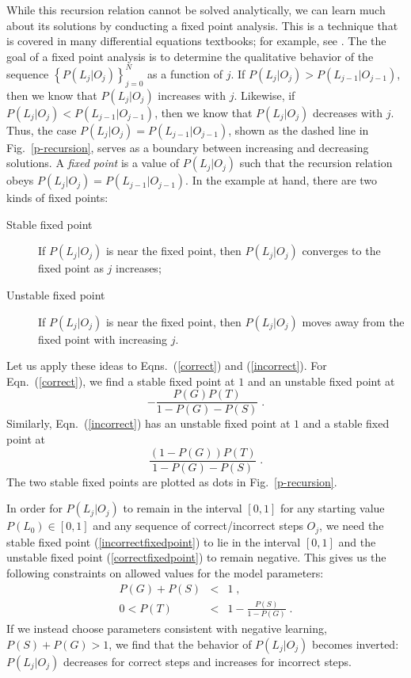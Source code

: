 \documentclass{acmlarge-edm}
\begin{document}
While this recursion relation cannot be solved analytically, we can learn
much about its solutions by conducting a fixed point analysis. 
This is a technique that is covered in many differential equations textbooks; for
example, see \cite{blanchard_differential_2006}.  The the goal of a
fixed point  analysis is to determine the qualitative behavior of the sequence
$\left\{P(L_j|O_j)\right\}_{j=0}^N$ as a
function of $j$.  If $P(L_j|O_j)>P(L_{j-1}|O_{j-1})$, then we know
that $P(L_j|O_j)$
increases with $j$.  Likewise, if $P(L_j|O_j)<P(L_{j-1}|O_{j-1})$,
then we know that $P(L_j|O_j)$ decreases with $j$.  Thus, the case
$P(L_j|O_j)=P(L_{j-1}|O_{j-1})$, shown as the dashed line in Fig.~\ref{p-recursion}, 
serves as a boundary between increasing and decreasing solutions.
A {\em fixed point} is a value of $P(L_j|O_j)$ such that the recursion
relation obeys $P(L_j|O_j)=P(L_{j-1}|O_{j-1})$.  In the example at
hand, there are two kinds of fixed points:
\begin{description}
  \item[Stable fixed point] If $P(L_j|O_j)$ is near the fixed point,
    then $P(L_j|O_j)$ converges to the fixed point as $j$ increases; 
  \item[Unstable fixed point]  If $P(L_j|O_j)$ is near the fixed
    point, then $P(L_j|O_j)$ moves away from the fixed point with
    increasing $j$. 
\end{description}

Let us apply these ideas to Eqns.~(\ref{correct}) and (\ref{incorrect}).
For Eqn.~(\ref{correct}), we find a stable fixed point at $1$ and 
an unstable fixed point at
%
\begin{equation}
    - \frac{P(G) P(T)}{1-P(G)-P(S)} \; .
      \label{correctfixedpoint}
\end{equation}
%
Similarly, Eqn.~(\ref{incorrect}) has an unstable fixed point at $1$
and a stable fixed point at
%
\begin{equation}
    \frac{\left(1-P(G)\right) P(T)}{1-P(G)-P(S)} \; . 
       \label{incorrectfixedpoint}
\end{equation}
%
The two stable fixed points are plotted as dots in Fig.~\ref{p-recursion}.


In order for $P(L_j|O_j)$ to remain in the interval $\left[0,1\right]$ 
for any starting value $P(L_0)\in \left[0,1\right]$ and any sequence of 
correct/incorrect steps $O_j$, 
we need the stable fixed point (\ref{incorrectfixedpoint})
to lie in the interval $\left[0,1\right]$ and the unstable fixed point 
(\ref{correctfixedpoint}) to remain negative.  This gives us the following
constraints on allowed values for the model parameters:
%
\begin{eqnarray}
        P(G)+P(S)&<& 1 \;, \label{littleconstraint}\\
        0 < P(T) &<& 1-\frac{P(S)}{1-P(G)}  \; .
        \label{bigconstraint}
\end{eqnarray}
%
If we instead choose parameters consistent with negative learning,
$P(S)+P(G)>1$, we find that the behavior of $P(L_j|O_j)$ becomes inverted: 
$P(L_j|O_j)$ decreases for correct steps and increases for incorrect steps.
\end{document}
